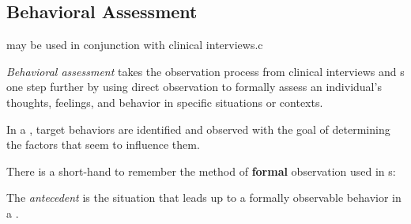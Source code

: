 \subsection{Behavioral Assessment}\label{subsec:Behavioral_Assessment}
 may be used in conjunction with clinical interviews.c

\begin{definition}\label{def:Behavioral_Assessment}
  \emph{Behavioral assessment} takes the observation process from clinical interviews and s one step further by using direct observation to formally assess an individual's thoughts, feelings, and behavior in specific situations or contexts.
\end{definition}

In a , target behaviors are identified and observed with the goal of determining the factors that seem to influence them.

There is a short-hand to remember the method of \textbf{formal} observation used in s:
\begin{description}[noitemsep]
\item[A] 
\item[B] 
\item[C] 
\end{description}

\begin{definition}[Antecedent]\label{def:Antecedent}
  The \emph{antecedent} is the situation that leads up to a formally observable behavior in a .
\end{definition}


